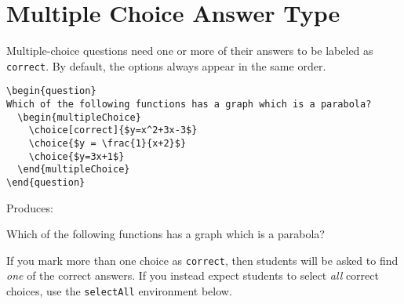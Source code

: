 \documentclass{ximera}
\begin{document}
\section{Multiple Choice Answer Type} \label{MCAnswerType}

\begin{example}
Multiple-choice questions need one or more of their answers to be labeled as \verb!correct!. By default, the options always appear in the same order.

\begin{verbatim}
\begin{question}
Which of the following functions has a graph which is a parabola?
  \begin{multipleChoice}
    \choice[correct]{$y=x^2+3x-3$}
    \choice{$y = \frac{1}{x+2}$}
    \choice{$y=3x+1$}
  \end{multipleChoice}
\end{question}
\end{verbatim}

Produces:

\begin{question}
  Which of the following functions has a graph which is a parabola?
  \begin{multipleChoice}
  \end{multipleChoice}
\end{question}

\begin{remark}
If you mark more than one choice as \verb!correct!, then students will be asked to find \emph{one} of the correct answers. If you instead expect students to select \emph{all} correct choices, use the \verb!selectAll! environment below.
\end{remark}

\end{example}
\end{document}
